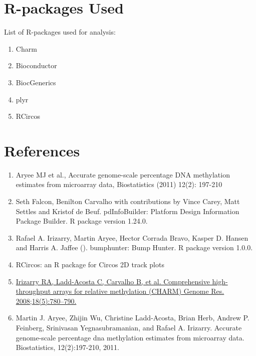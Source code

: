 \documentclass[11pt]{article}
\begin{document}
\section*{R-packages Used}

List of R-packages used for analysis:
\begin{enumerate}[itemsep=-0.2mm]

\item Charm

\item Bioconductor

\item BiocGenerics

\item plyr

\item RCircos


\end{enumerate}




\section*{References}  
\begin{enumerate}


	\item  Aryee MJ et al., Accurate genome-scale percentage DNA methylation estimates
	  from microarray data, Biostatistics (2011) 12(2): 197-210 	

	\item  Seth Falcon, Benilton Carvalho with contributions by Vince Carey, Matt
	  Settles and Kristof de Beuf. pdInfoBuilder: Platform Design Information
	  Package Builder. R package version 1.24.0.
	
	\item   Rafael A. Irizarry, Martin Aryee, Hector Corrada Bravo, Kasper D. Hansen and	Harris A. Jaffee (). bumphunter: Bump Hunter. R package version 1.0.0.
		
	\item RCircos: an R package for Circos 2D track plots
	


	\item \href{http://www.ncbi.nlm.nih.gov/pmc/articles/PMC2336799/}{Irizarry RA, Ladd-Acosta C, Carvalho B, et al. Comprehensive high-throughput arrays for relative methylation (CHARM) Genome Res. 2008;18(5):780–790.} 
	
	\item Martin J. Aryee, Zhijin Wu, Christine Ladd-Acosta, Brian Herb, Andrew P.
Feinberg, Srinivasan Yegnasubramanian, and Rafael A. Irizarry. Accurate
genome-scale percentage dna methylation estimates from microarray data.
Biostatistics, 12(2):197-210, 2011.

\end{enumerate}
\end{document}
